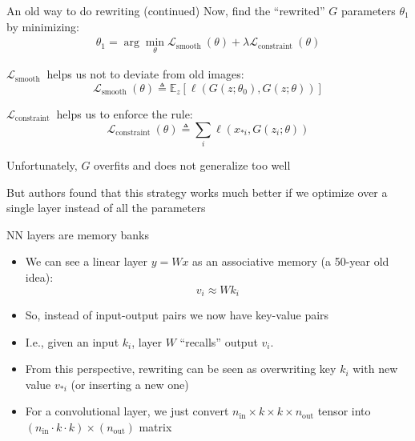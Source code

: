 \documentclass[handout, 10pt]{beamer}
\begin{document}
\begin{frame}{An old way to do rewriting (continued)}
\pause
Now, find the ``rewrited'' $G$ parameters $\theta_1$ by minimizing:
    \begin{equation}
\begin{aligned}
\theta_{1} =\arg \min _{\theta} \mathcal{L}_{\text {smooth }}(\theta)+\lambda \mathcal{L}_{\text {constraint }}(\theta)
\end{aligned}
\end{equation}

\pause
$\mathcal{L}_{\text {smooth }}$ helps us not to deviate from old images:
    \begin{equation}
        \mathcal{L}_{\text {smooth }}(\theta) \triangleq \mathbb{E}_{z}\left[\ell\left(G\left(z ; \theta_{0}\right), G(z ; \theta)\right)\right]
    \end{equation}
    
\pause
$\mathcal{L}_{\text {constraint }}$ helps us to enforce the rule:
    \begin{equation}
        \mathcal{L}_{\text {constraint }}(\theta) \triangleq \sum_{i} \ell\left(x_{* i}, G\left(z_{i} ; \theta\right)\right)
    \end{equation}

\pause
Unfortunately, $G$ overfits and does not generalize too well

\pause
But authors found that this strategy works much better if we optimize over a single layer instead of all the parameters
\end{frame}


\begin{frame}{NN layers are memory banks}
\begin{itemize}
    \item\pause We can see a linear layer $y = Wx$ as an associative memory (a 50-year old idea):
\begin{equation}
    v_i \approx W k_i
\end{equation}
    \item\pause So, instead of input-output pairs we now have key-value pairs
    \item\pause I.e., given an input $k_i$, layer $W$ ``recalls'' output $v_i$.
    \item\pause From this perspective, rewriting can be seen as overwriting key $k_i$ with new value $v_{*i}$ (or inserting a new one)
    \item\pause For a convolutional layer, we just convert $n_\text{in} \times k \times k \times n_\text{out}$ tensor into $(n_\text{in} \cdot k \cdot k) \times (n_\text{out})$ matrix
\end{itemize}
\end{frame}
\end{document}
